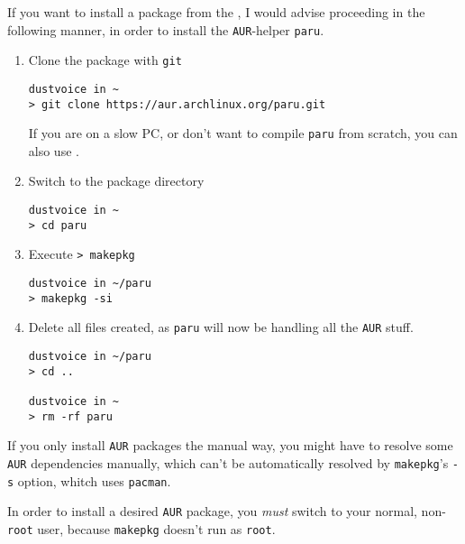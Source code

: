\documentclass[10pt]{dustdoc}
\begin{document}
If you want to install a package from the , I would advise proceeding in the following manner, in order to install the \texttt{AUR}-helper \texttt{paru}.

\begin{enumerate}
    \item Clone the package with \texttt{git}

        \begin{verbatim}
dustvoice in ~
> git clone https://aur.archlinux.org/paru.git
        \end{verbatim}


        \begin{NOTE}
            If you are on a slow PC, or don't want to compile \texttt{paru} from scratch, you can also use .
        \end{NOTE}

    \item Switch to the package directory

        \begin{verbatim}
dustvoice in ~
> cd paru
        \end{verbatim}


    \item Execute \texttt{> makepkg}

        \begin{verbatim}
dustvoice in ~/paru
> makepkg -si
        \end{verbatim}


    \item Delete all files created, as \texttt{paru} will now be handling all the \texttt{AUR} stuff.

        \begin{verbatim}
dustvoice in ~/paru
> cd ..

dustvoice in ~
> rm -rf paru
        \end{verbatim}

\end{enumerate}

\begin{NOTE}
    If you only install \texttt{AUR} packages the manual way, you might have to resolve some \texttt{AUR} dependencies manually, which can’t be automatically resolved by \texttt{makepkg}'s \texttt{-s} option, whitch uses \texttt{pacman}.
\end{NOTE}

\begin{WARNING}
    In order to install a desired \texttt{AUR} package, you \emph{must} switch to your normal, non-\texttt{root} user, because \texttt{makepkg} doesn’t run as \texttt{root}.
\end{WARNING}
\end{document}
